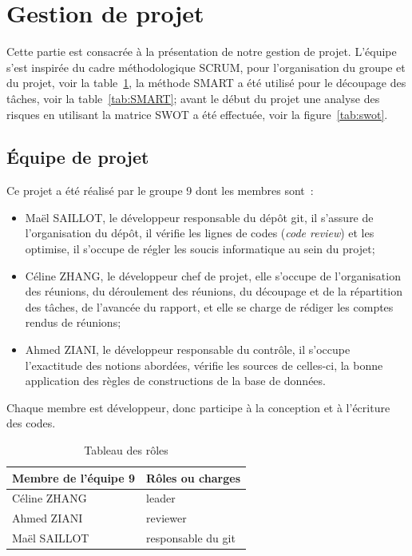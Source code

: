 \documentclass[12pt]{article}
\begin{document}
\newpage

\section{Gestion de projet}
    Cette partie est consacrée à la présentation de notre gestion de projet. L'équipe s'est inspirée du cadre méthodologique SCRUM, pour l'organisation du groupe et du projet, voir la table~\ref{tab:roles}, la méthode SMART a été utilisé pour le découpage des tâches, voir la table~\ref{tab:SMART}; avant le début du projet une analyse des risques en utilisant la matrice SWOT a été effectuée, voir la figure~\ref{tab:swot}.
    \subsection{Équipe de projet}
    Ce projet a été réalisé par le groupe 9 dont les membres sont~:
    \begin{itemize}[label=\textbullet]
        \item Maël SAILLOT, le développeur responsable du dépôt \textsf{git}, il s'assure de l'organisation du dépôt, il vérifie les lignes de codes (\textsl{code review}) et les optimise, il s'occupe de régler les soucis informatique au sein du projet;
        \item Céline ZHANG, le développeur chef de projet, elle s'occupe de l'organisation des réunions, du déroulement des réunions, du découpage et de la répartition des tâches, de l'avancée du rapport, et elle se charge de rédiger les comptes rendus de réunions;
        \item Ahmed ZIANI, le développeur responsable du contrôle, il s'occupe l'exactitude des notions abordées, vérifie les sources de celles-ci, la bonne application des règles de constructions de la base de données.
    \end{itemize}
Chaque membre est développeur, donc participe à la conception et à l'écriture des codes.%
    \begin{table}[!h]
    \begin{center}
        \begin{tabular}{|l|l|}
        \hline
            Membre de l'équipe 9 & Rôles ou charges \\
        \hline
        \hline
            Céline ZHANG & leader \\
        \hline
            Ahmed ZIANI & reviewer \\
        \hline
            Maël SAILLOT & responsable du git \\
        \hline
        \end{tabular}\\
    \end{center}
    \caption{Tableau des rôles}
    \label{tab:roles}
    \end{table}
\end{document}
